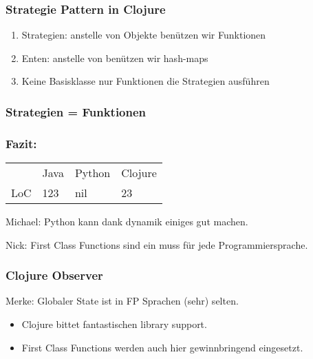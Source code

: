 \documentclass[compress, blue]{beamer}
\begin{document}


\begin{frame}\frametitle{Strategie Pattern in Clojure}
  \begin{enumerate}
  \item Strategien: anstelle von Objekte benützen wir Funktionen
    \pause
  \item Enten: anstelle von benützen wir hash-maps 
    \pause
  \item Keine Basisklasse nur Funktionen die Strategien ausführen 
    \pause
  \end{enumerate}
\end{frame}

\begin{frame}\frametitle{Strategien = Funktionen}
  
\end{frame}





\begin{frame}\frametitle{Fazit:}

  \begin{tabular}{l | l l l}
     & Java &  Python & Clojure  \\
    LoC & 123 &  nil & 23  \\
  \end{tabular}
  \vspace{1cm}

  \begin{block}{Michael:}
    Python kann dank dynamik einiges gut machen.
  \end{block}

  \begin{block}{Nick: }
    First Class Functions sind ein muss für jede Programmiersprache.
  \end{block}

\end{frame}




\begin{frame}\frametitle{Clojure Observer}

  \begin{block}{Merke:}    
     Globaler State ist in FP Sprachen (sehr) selten.
  \end{block}

  \begin{center}
    \begin{itemize}
      \item Clojure bittet fantastischen library support.
      \item First Class Functions werden auch hier gewinnbringend
        eingesetzt.
    \end{itemize}    
  \end{center}

\end{frame}
\end{document}
